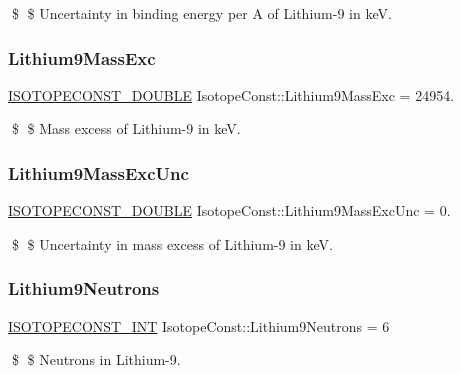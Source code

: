 \$ \$ Uncertainty in binding energy per A of Lithium-\/9 in keV. \mbox{\label{group___isotope_const-_lithium-_li9_gadbf61ed4e327a81824e824437d6919d0}} 
\subsubsection{\texorpdfstring{Lithium9\+Mass\+Exc}{Lithium9MassExc}}
{\footnotesize\ttfamily \mbox{\hyperlink{group___isotope_const-_macros_ga8f45a7272ce02c0b4c65c44636ed719a}{I\+S\+O\+T\+O\+P\+E\+C\+O\+N\+S\+T\+\_\+\+D\+O\+U\+B\+LE}} Isotope\+Const\+::\+Lithium9\+Mass\+Exc = 24954.}

\$ \$ Mass excess of Lithium-\/9 in keV. \mbox{\label{group___isotope_const-_lithium-_li9_gae04b2f2f907650b7a23fb4d551d76b3e}} 
\subsubsection{\texorpdfstring{Lithium9\+Mass\+Exc\+Unc}{Lithium9MassExcUnc}}
{\footnotesize\ttfamily \mbox{\hyperlink{group___isotope_const-_macros_ga8f45a7272ce02c0b4c65c44636ed719a}{I\+S\+O\+T\+O\+P\+E\+C\+O\+N\+S\+T\+\_\+\+D\+O\+U\+B\+LE}} Isotope\+Const\+::\+Lithium9\+Mass\+Exc\+Unc = 0.}

\$ \$ Uncertainty in mass excess of Lithium-\/9 in keV. \mbox{\label{group___isotope_const-_lithium-_li9_gaf5d271863308a4cab3213cad0823ee9f}} 
\subsubsection{\texorpdfstring{Lithium9\+Neutrons}{Lithium9Neutrons}}
{\footnotesize\ttfamily \mbox{\hyperlink{group___isotope_const-_macros_ga5f18360b3e99483a35c32d789e62621c}{I\+S\+O\+T\+O\+P\+E\+C\+O\+N\+S\+T\+\_\+\+I\+NT}} Isotope\+Const\+::\+Lithium9\+Neutrons = 6}

\$ \$ Neutrons in Lithium-\/9. \mbox{\label{group___isotope_const-_lithium-_li9_ga264b44046947e03a2b6d885809acb3ad}} 
